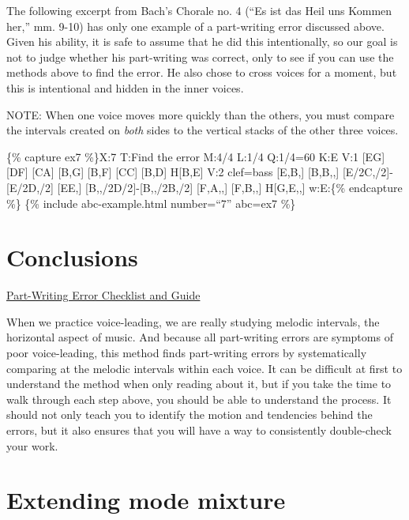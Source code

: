 \documentclass{book}
\begin{document}
The following excerpt from Bach's Chorale no. 4 (``Es ist das Heil uns Kommen
her,'' mm. 9-10) has only one example of a part-writing error discussed above.
Given his ability, it is safe to assume that he did this intentionally, so our
goal is not to judge whether his part-writing was correct, only to see if you
can use the methods above to find the error. He also chose to cross voices for
a moment, but this is intentional and hidden in the inner voices.

NOTE: When one voice moves more quickly than the others, you must compare the
intervals created on \emph{both} sides to the vertical stacks of the other
three voices.

\{\% capture ex7 \%\}X:7 T:Find the error M:4/4 L:1/4 Q:1/4=60 K:E V:1
{[}EG{]}\textbar{} {[}DF{]} {[}CA{]} {[}B,G{]} {[}B,F{]}\textbar{} {[}CC{]}
{[}B,D{]} H{[}B,E{]}\textbar{]} V:2 clef=bass {[}E,B,{]}\textbar{} {[}B,B,,{]}
{[}E/2C,/2{]}-{[}E/2D,/2{]} {[}EE,{]} {[}B,,/2D/2{]}-{[}B,,/2B,/2{]}\textbar{}
{[}F,A,,{]} {[}F,B,,{]} H{[}G,E,,{]}\textbar{]} w:E:\{\% endcapture \%\} \{\%
include abc-example.html number=``7'' abc=ex7 \%\}

\hypertarget{conclusions-49}{%
\section{Conclusions}\label{conclusions-49}}

\href{https://docs.google.com/document/d/1s9Xd3LPqoaEevshTopxHzLX9jCzxVCZocOBLD_dceMU/edit?usp=sharing}{Part-Writing
Error Checklist and Guide}

When we practice voice-leading, we are really studying melodic intervals, the
horizontal aspect of music. And because all part-writing errors are symptoms
of poor voice-leading, this method finds part-writing errors by systematically
comparing at the melodic intervals within each voice. It can be difficult at
first to understand the method when only reading about it, but if you take the
time to walk through each step above, you should be able to understand the
process. It should not only teach you to identify the motion and tendencies
behind the errors, but it also ensures that you will have a way to
consistently double-check your work.

\hypertarget{extending-mode-mixture}{%
\section{Extending mode mixture}\label{extending-mode-mixture}}
\end{document}

